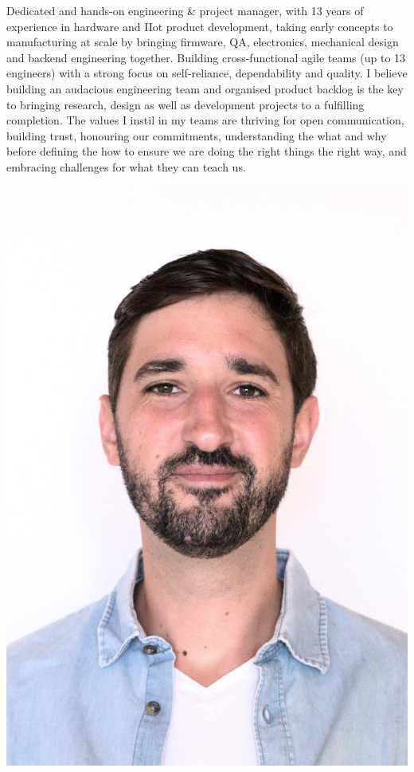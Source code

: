 \documentclass[10pt,a4paper]{moderncv}
\begin{document}
\makecvhead

\vspace{2em}


\vspace{0.5em}
\begin{minipage}{0.80\textwidth}
  Dedicated and hands-on engineering \& project manager, with 13 years of experience in hardware and IIot product development, taking early concepts to manufacturing at scale by bringing firmware, QA, electronics, mechanical design and backend engineering together. Building cross-functional agile teams (up to 13 engineers) with a strong focus on self-reliance, dependability and quality. I believe building an audacious engineering team and organised product backlog is the key to bringing research, design as well as development projects to a fulfilling completion. The values I instil in my teams are thriving for open communication, building trust, honouring our commitments, understanding the what and why before defining the how to ensure we are doing the right things the right way, and embracing challenges for what they can teach us.
\end{minipage}
\hfill
\begin{minipage}{0.18\textwidth}
  \includegraphics[width=\linewidth]{portrait_freehand.jpg}%
  \vspace{0.1em}
\end{minipage}
\end{document}
